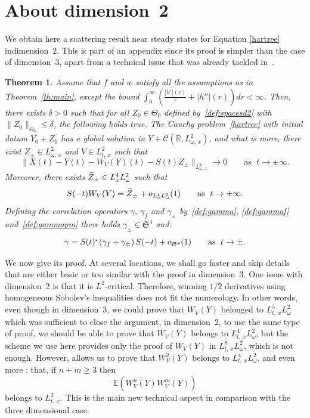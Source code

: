 \documentclass[10pt]{amsart}
\newtheorem{theo}{Theorem}[section]
\theoremstyle{definition}\newtheorem{defi}[theo]{Definition}\newtheorem{rema}[theo]{Remark}\newtheorem{exam}[theo]{Example}\newtheorem{exem}[theo]{Example}\newtheorem{nota}[theo]{Notation}
\newcommand{\R}{\mathbb{R}}
\newcommand{\E}{\mathbb{E}}
\newcommand{\mclC}{\mathcal{C}}
\newcommand{\frkS}{\mathfrak{S}}
\let\oldtilde\tilde
\renewcommand*{\tilde}[1]{\mathchoice{\widetilde{#1}}{\widetilde{#1}}{\oldtilde{#1}}{\oldtilde{#1}}}
\begin{document}
\appendix

\section{About dimension~2}\label{sec:dim2}


We obtain here a scattering result near steady states for Equation \eqref{hartree} in\linebreak dimension~2. This is part of an appendix since its proof is simpler than the case of dimension~3, apart from a technical issue that was already tackled in~\cite{FLLS,lewsab2}.


\begin{theo}\label{th:dim2}
Assume that $f$ and $w$ satisfy all the assumptions as in Theorem~\ref{th:main}, except the bound $\int_0^\infty (\tfrac{|h'|(r)}{r}+|h''|(r))dr<\infty$. Then, there exists $\delta >0$ such that for all $Z_0 \in \Theta_0$ defined by~\eqref{def:spacesd2} with $\| Z_0 \|_{\Theta_0}\leq \delta$, the following holds true. The Cauchy problem~\eqref{hartree} with initial datum $Y_0+Z_0$ has a global solution in $Y + \mclC (\R, L^2_{\omega,\,x})$, and what is more, there exist $Z_\pm \in L^2_{\omega,\,x}$ and $V\in L^{2}_{t,\,x}$ such that
\begin{equation} \label{id:scatteringd=2}
\big\|X(t) - Y(t) - W_V(Y)(t)-S(t) Z_\pm\big\|_{L^2_{\omega,\,x}} \rightarrow 0 \quad \quad \text{as }\; t\rightarrow \pm \infty.
\end{equation}
Moreover, there exists $\tilde Z_\pm \in L^4_x L^2_\omega$ such that
\[
S(-t)W_V(Y) = \tilde Z_\pm + o_{L^4_x L^2_\omega} (1) \quad \quad \text{as }\; t\rightarrow \pm \infty.
\]
Defining the correlation operators $\gamma$, $\gamma_f$ and $\gamma_\pm$ by~\eqref{def:gamma}, \eqref{def:gammaf} and~\eqref{def:gammapm} there holds $\gamma_\pm \in \frkS^{4}$ and:
\begin{equation} \label{id:scatteringdensityd=2}
\gamma=S(t)`\left(\gamma_f+\gamma_\pm\right)S(-t)+o_{\frkS^4}(1) \quad \quad \text{as }\; t\rightarrow \pm.
\end{equation}
\end{theo}



We now give its proof. At several locations, we shall go faster and skip details that are either basic or too similar with the proof in dimension~3. One issue with dimension~2 is that it is $L^2$-critical. Therefore, winning $1/2$ derivatives using homogeneous Sobolev's inequalities does not fit the numerology. In other words, even though in dimension~3, we could prove that $W_V(Y)$ belonged to $L^5_{t,\,x} L^2_\omega$ which was sufficient to close the argument, in dimension~2, to use the same type of proof, we should be able to prove that $W_V(Y)$ belongs to $L^4_{t,\,x} L^2_\omega$, but the scheme we use here provides only the proof of $W_V(Y)$ in $L^8_{t,\,x} L^2_\omega$, which is not enough. However, \cite[Lemma~3 in Section~4]{lewsab2} allows us to prove that $W_V^2(Y)$ belongs to $L^4_{t,\,x} L^2_\omega$, and even more : that, if $n+m \geq 3$ then
\[
\E\left(\overline{W_V^n(Y)} W_V^m(Y)\right)
\]
belongs to $L^2_{t,\,x}$. This is the main new technical aspect in comparison with the three dimensional case.
\end{document}

